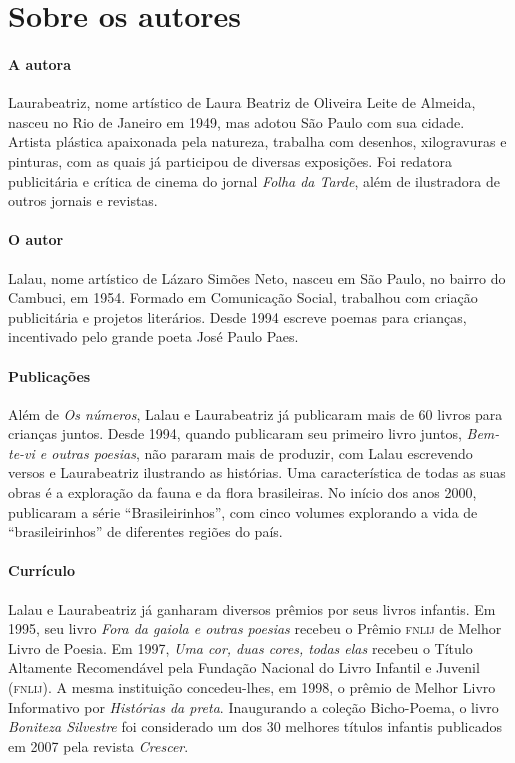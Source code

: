 \documentclass[11pt]{extarticle}
\begin{document}
\section{Sobre os autores}

\paragraph{A autora} Laurabeatriz, nome artístico de Laura Beatriz de Oliveira Leite de Almeida, nasceu no Rio de Janeiro em 1949, mas adotou São Paulo com sua cidade. Artista plástica apaixonada pela natureza, trabalha com desenhos, xilogravuras e pinturas, com as quais já participou de diversas exposições. Foi redatora publicitária e crítica de cinema do jornal \textit{Folha da Tarde}, além de ilustradora de outros jornais e revistas.

\paragraph{O autor} Lalau, nome artístico de Lázaro Simões Neto, nasceu em São Paulo, no bairro do Cambuci, em 1954. Formado em Comunicação Social, trabalhou com criação publicitária e projetos literários. Desde 1994 escreve poemas para crianças, incentivado pelo grande poeta José Paulo Paes.

\paragraph{Publicações} Além de \textit{Os números}, Lalau e Laurabeatriz já publicaram mais de 60 livros para crianças juntos. Desde 1994, quando publicaram seu primeiro livro juntos, \textit{Bem-te-vi e outras poesias}, não pararam mais de produzir, com Lalau escrevendo versos e Laurabeatriz ilustrando as histórias. Uma característica de todas as suas obras é a exploração da fauna e da flora brasileiras. No início dos anos 2000, publicaram a série ``Brasileirinhos'', com cinco volumes explorando a vida de ``brasileirinhos'' de diferentes regiões do país. 

\paragraph{Currículo} Lalau e Laurabeatriz já ganharam diversos prêmios por seus livros infantis. Em 1995, seu livro \textit{Fora da gaiola e outras poesias} recebeu o Prêmio \textsc{fnlij} de Melhor Livro de Poesia. Em 1997, \textit{Uma cor, duas cores, todas elas} recebeu o Título Altamente Recomendável pela Fundação Nacional do Livro Infantil e Juvenil (\textsc{fnlij}). A mesma instituição concedeu-lhes, em 1998, o prêmio de Melhor Livro Informativo por \textit{Histórias da preta}. Inaugurando a coleção Bicho-Poema, o livro \textit{Boniteza Silvestre} foi considerado um dos 30 melhores títulos infantis publicados em 2007 pela revista \textit{Crescer}. 
 
\end{document}
